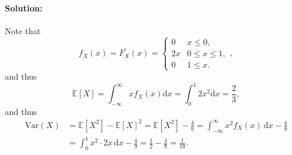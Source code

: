 \documentclass[a4paper,12pt]{article}
\begin{document}
\paragraph{Solution:} Note that 
\[
	f_X(x) = F_X^{\prime} (x) = \begin{cases}
		0 & x \le 0, \\
		2x & 0 \le x \le 1, \\
		0 & 1 \le x.
	\end{cases},
\]
and thus 
\[
	\mathbb{E} [X] = \int_{-\infty}^{\infty} x f_X(x) \mathrm{d}x = \int_0^1 2x^2 \mathrm{d}x = \frac{2}{3},
\]
and thus 
\begin{align*}
	\mathrm{Var} (X) &= \mathbb{E} [X^2] - \mathbb{E} [X]^2 = \mathbb{E} [X^2] - \frac{4}{9} = \int _{-\infty}^{\infty} x^2 f_X(x) \, \mathrm{d} x - \frac{4}{9} \\
	&= \int _0^1 x^2 \cdot 2x \, \mathrm{d}x - \frac{4}{9} = \frac{1}{2} - \frac{4}{9} = \frac{1}{18}.
\end{align*}
\end{document}
